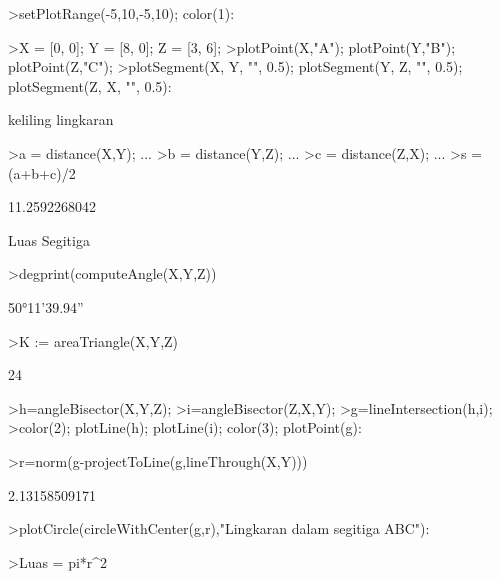\documentclass[a4paper,10pt]{article}
\begin{document}
\begin{eulernotebook}
\begin{eulerprompt}
>setPlotRange(-5,10,-5,10); color(1):
\end{eulerprompt}
\begin{eulerprompt}
>X = [0, 0]; Y = [8, 0]; Z = [3, 6];
>plotPoint(X,"A"); plotPoint(Y,"B"); plotPoint(Z,"C");
>plotSegment(X, Y, "", 0.5); plotSegment(Y, Z, "", 0.5); plotSegment(Z, X, "", 0.5):
\end{eulerprompt}
\begin{eulercomment}
keliling lingkaran
\end{eulercomment}
\begin{eulerprompt}
>a = distance(X,Y); ...
>b = distance(Y,Z);  ...
>c = distance(Z,X); ...
>s = (a+b+c)/2
\end{eulerprompt}
\begin{euleroutput}
  11.2592268042
\end{euleroutput}
\begin{eulercomment}
Luas Segitiga
\end{eulercomment}
\begin{eulerprompt}
>degprint(computeAngle(X,Y,Z))
\end{eulerprompt}
\begin{euleroutput}
  50°11'39.94''
\end{euleroutput}
\begin{eulerprompt}
>K := areaTriangle(X,Y,Z)
\end{eulerprompt}
\begin{euleroutput}
  24
\end{euleroutput}
\begin{eulerprompt}
>h=angleBisector(X,Y,Z);
>i=angleBisector(Z,X,Y);
>g=lineIntersection(h,i);
>color(2); plotLine(h); plotLine(i); color(3); plotPoint(g):
\end{eulerprompt}
\begin{eulerprompt}
>r=norm(g-projectToLine(g,lineThrough(X,Y)))
\end{eulerprompt}
\begin{euleroutput}
  2.13158509171
\end{euleroutput}
\begin{eulerprompt}
>plotCircle(circleWithCenter(g,r),"Lingkaran dalam segitiga ABC"):
\end{eulerprompt}
\begin{eulerprompt}
>Luas = pi*r^2
\end{eulerprompt}
\begin{euleroutput}

\end{euleroutput}
\end{eulernotebook}
\end{document}
